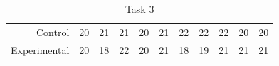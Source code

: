 \begin{table}[ht]
	\centering
	\caption{Task 3}
	\label{exe:20_3}
	\begin{tabular}{rrrrrrrrrrr}
		\hline
		Control      & 20 & 21 & 21 & 20 & 21 & 22 & 22 & 22 & 20 & 20 \\
		Experimental & 20 & 18 & 22 & 20 & 21 & 18 & 19 & 21 & 21 & 21 \\
		\hline
	\end{tabular}
\end{table}
